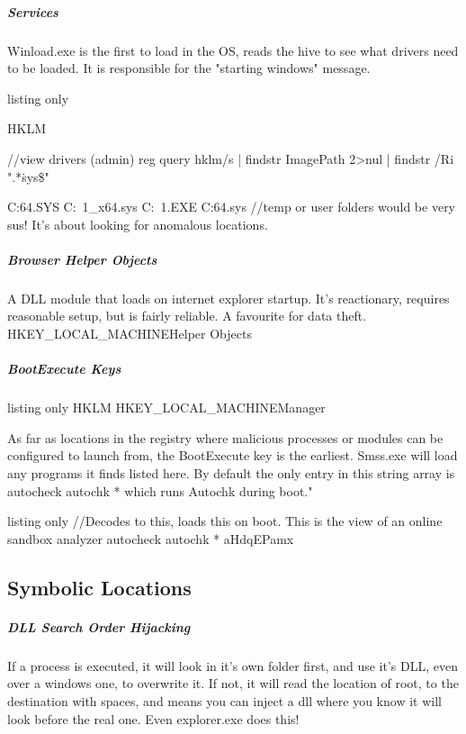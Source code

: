 \subparagraph{Services}
Winload.exe is the first to load in the OS, reads the hive to see what drivers need to be loaded. It is responsible for the "starting windows" message.
\begin{tcblisting}{listing only}

HKLM\SYSTEM\CurrentControlSet\Services

//view drivers (admin)
reg query hklm\system\currentcontrolset\services /s | findstr ImagePath 2>nul | findstr /Ri ".*\.sys\$"

C:\WINDOWS\TEMP\INSTB64.SYS C:\Users\USERNA~1\AppData\Local\Temp{}_x64.sys C:\Windows\TEMP{}~1.EXE C:\Users\username\AppData\Local\Temp\ALSysIO64.sys
//temp or user folders would be very sus! It's about looking for anomalous locations.



\subparagraph{Browser Helper Objects}
A DLL module that loads on internet explorer startup. It's reactionary, requires reasonable setup, but is fairly reliable. A favourite for data theft.
HKEY_LOCAL_MACHINE\SOFTWARE\Microsoft\Windows\CurrentVersion\Explorer\Browser Helper Objects
\end{tcblisting}

\subparagraph{BootExecute Keys}
\begin{tcblisting}{listing only}
HKLM\SYSTEM\CurrentControlSet\Control\hivelist
HKEY_LOCAL_MACHINE\SYSTEM{}\Control\Session Manager
\end{tcblisting}

As far as locations in the registry where malicious processes or modules can be configured to launch from, the BootExecute key is the earliest. Smss.exe will load any programs it finds listed here. By default the only entry in this string array is autocheck autochk * which runs Autochk during boot."

\begin{tcblisting}{listing only}
//Decodes to this, loads this on boot. This is the view of an online sandbox analyzer
autocheck autochk * aHdqEPamx
\end{tcblisting}


\subsection{Symbolic Locations}

\subparagraph{DLL Search Order Hijacking}
If a process is executed, it will look in it's own folder first, and use it's DLL, even over a windows one, to overwrite it. If not, it will read the location of root, 
to the destination with spaces, and means you can inject a dll where you know it will look before the real one. Even explorer.exe does this!

